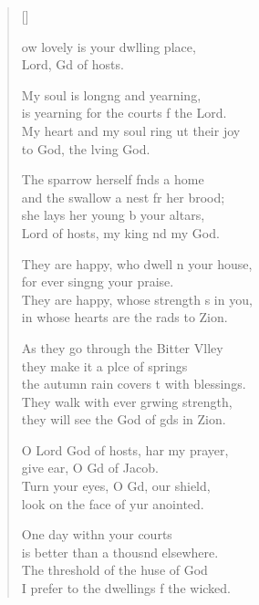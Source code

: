 \settowidth{\versewidth}{They are happy, whose strength is in you, *}
\begin{verse}[\versewidth]
  \begin{patverse}
ow lovely is your dwlling place,\Med\\
Lord, Gd of hosts.

My soul is long\pointup{\i}ng and yearning,\Med\\
is yearning for the courts f the Lord.\\
My heart and my soul ring ut their joy\Med\\
to God, the l\pointup{\i}ving God.

The sparrow herself f\pointup{\i}nds a home\Med\\
and the swallow a nest fr her brood;\\
she lays her young b your altars,\Med\\
Lord of hosts, my king nd my God.

They are happy, who dwell \pointup{\i}n your house,\Med\\
for ever sing\pointup{\i}ng your praise.\\
They are happy, whose strength \pointup{\i}s in you,\Med\\
in whose hearts are the rads to Zion.

As they go through the Bitter Vlley\Flex\\
they make it a plce of springs\Med\\
the autumn rain covers \pointup{\i}t with blessings.\\
They walk with ever grwing strength,\Med\\
they will see the God of gds in Zion.

O Lord God of hosts, har my prayer,\Med\\
give ear, O Gd of Jacob.\\
Turn your eyes, O Gd, our shield,\Med\\
look on the face of yur anointed.

One day with\pointup{\i}n your courts\Med\\
is better than a thousnd elsewhere.\\
The threshold of the huse of God\Med\\
I prefer to the dwellings f the wicked.


\end{patverse}
\end{verse}

